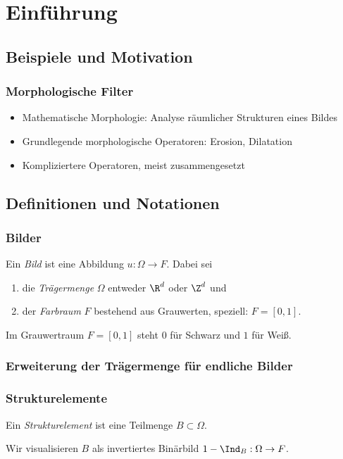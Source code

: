 \documentclass{beamer}
\begin{document}
\section{Einführung}

\subsection{Beispiele und Motivation}

\begin{frame}
    \frametitle{Morphologische Filter}
    \begin{itemize}
        \item
            Mathematische Morphologie: Analyse räumlicher Strukturen eines Bildes
        \item
            Grundlegende morphologische Operatoren: Erosion, Dilatation
        \item
            Kompliziertere Operatoren, meist zusammengesetzt
    \end{itemize}
\end{frame}


\subsection{Definitionen und Notationen}

\begin{frame}
    \frametitle{Bilder}
    \begin{definition}
        Ein \emph{Bild} ist eine Abbildung $u: \Omega \to F$. \pause
        Dabei sei
        \begin{enumerate}[1.]
            \item
                die \emph{Trägermenge} $\Omega$ entweder $\R^d$ oder $\Z^d$ \pause und
            \item
                der \emph{Farbraum} $F$ bestehend aus Grauwerten, speziell: $F = [0,1]$.
        \end{enumerate}
    \end{definition}
    \pause
    Im Grauwertraum $F = [0,1]$ steht $0$ für Schwarz und $1$ für Weiß.
\end{frame}

\begin{frame}
    \frametitle{Erweiterung der Trägermenge für endliche Bilder}
\end{frame}

\begin{frame}
    \frametitle{Strukturelemente}
    \begin{definition}
        Ein \emph{Strukturelement} ist eine Teilmenge $B \subset \Omega$.
    \end{definition}
    \pause
    Wir visualisieren $B$ als invertiertes Binärbild $1 - \Ind_B: \Omega \to F$.
\end{frame}
\end{document}
